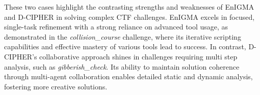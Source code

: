 These two cases highlight the contrasting strengths and weaknesses of EnIGMA and D-CIPHER in solving complex CTF challenges. EnIGMA excels in focused, single-task refinement with a strong reliance on advanced tool usage, as demonstrated in the \textit{collision\_course} challenge, where its iterative scripting capabilities and effective mastery of various tools lead to success. In contrast, D-CIPHER’s collaborative approach shines in challenges requiring multi step analysis, such as \textit{gibberish\_check}. Its ability to maintain solution coherence through multi-agent collaboration enables detailed static and dynamic analysis, fostering more creative solutions. %






